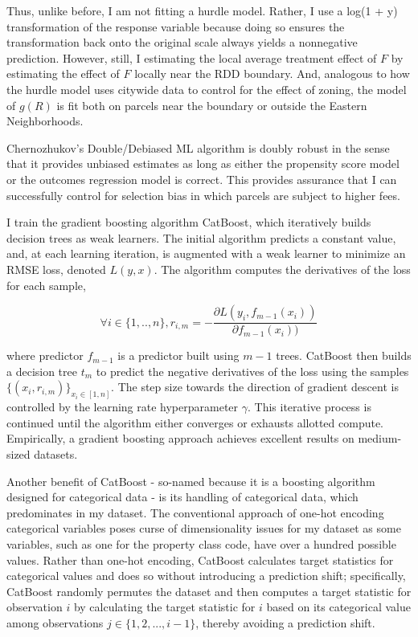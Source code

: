 \documentclass[a4paper,12pt]{article}
\begin{document}
Thus, unlike before, I am not fitting a hurdle model. Rather, I use a log(1 + y) transformation of the response variable because doing so ensures the transformation back onto the original scale always yields a nonnegative prediction. However, still, I estimating the local average treatment effect of $F$ by estimating the effect of $F$ locally near the RDD boundary. And, analogous to how the hurdle model uses citywide data to control for the effect of zoning, the model of $g(R)$ is fit both on parcels near the boundary or outside the Eastern Neighborhoods.

Chernozhukov's Double/Debiased ML algorithm is doubly robust in the sense that it provides unbiased estimates as long as either the propensity score model or the outcomes regression model is correct.\cite{chernozhukov2018double} This provides assurance that I can successfully control for selection bias in which parcels are subject to higher fees.

I train the gradient boosting algorithm CatBoost, which iteratively builds decision trees as weak learners. The initial algorithm predicts a constant value, and, at each learning iteration, is augmented with a weak learner to minimize an RMSE loss, denoted $L(y,x)$. The algorithm computes the derivatives of the loss for each sample, 

\begin{equation}\label{eq:catboostDerivatives}
\forall i \in \{1,..,n\},   r_{i,m}= -\frac{\partial L(y_{i},f_{m-1}(x_{i}))}{\partial f_{m-1}(x_{i}))}
\end{equation}

where predictor $f_{m-1}$ is a predictor built using $m - 1$ trees. CatBoost then builds a decision tree $t_{m}$ to predict the negative derivatives of the loss using the samples $\{(x_{i},r_{i,m})\}_{x_{i} \in [1,n]}$. The step size towards the direction of gradient descent is controlled by the learning rate hyperparameter $\gamma$. This iterative process is continued until the algorithm either converges or exhausts allotted compute.\cite{prokhorenkova2018catboost} Empirically, a gradient boosting approach achieves excellent results on medium-sized datasets.\cite{bentejac2021comparative}

Another benefit of CatBoost - so-named because it is a boosting algorithm designed for categorical data - is its handling of categorical data, which predominates in my dataset. The conventional approach of one-hot encoding categorical variables poses curse of dimensionality issues for my dataset as some variables, such as one for the property class code, have over a hundred possible values. Rather than one-hot encoding, CatBoost calculates target statistics for categorical values and does so without introducing a prediction shift; specifically, CatBoost randomly permutes the dataset and then computes a target statistic for observation $i$ by calculating the target statistic for $i$ based on its categorical value among observations $j \in \{1, 2, ..., i-1\}$, thereby avoiding a prediction shift.\cite{prokhorenkova2018catboost}
\end{document}
